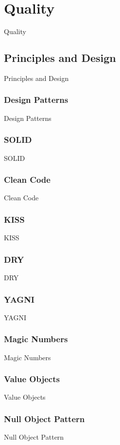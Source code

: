 \section{Quality}\label{sec:quality}
Quality

\subsection{Principles and Design}\label{subsec:principles}
Principles and Design

\subsubsection{Design Patterns}
Design Patterns

\subsubsection{SOLID}
SOLID

\subsubsection{Clean Code}
Clean Code

\subsubsection{KISS}
KISS

\subsubsection{DRY}
DRY

\subsubsection{YAGNI}
YAGNI

\subsubsection{Magic Numbers}
Magic Numbers

\subsubsection{Value Objects}
Value Objects

\subsubsection{Null Object Pattern}
Null Object Pattern

